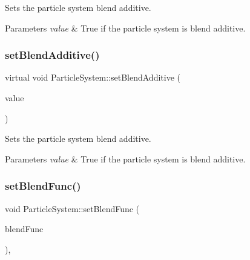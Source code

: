 Sets the particle system blend additive.


\begin{DoxyParams}{Parameters}
{\em value} & True if the particle system is blend additive. \\
\hline
\end{DoxyParams}
\mbox{\label{classParticleSystem_a08affe076082421f74e427128de30509}} 
\subsubsection{\texorpdfstring{set\+Blend\+Additive()}{setBlendAdditive()}\hspace{0.1cm}{\footnotesize\ttfamily [2/2]}}
{\footnotesize\ttfamily virtual void Particle\+System\+::set\+Blend\+Additive (\begin{DoxyParamCaption}\item[{bool}]{value }\end{DoxyParamCaption})\hspace{0.3cm}{\ttfamily [virtual]}}

Sets the particle system blend additive.


\begin{DoxyParams}{Parameters}
{\em value} & True if the particle system is blend additive. \\
\hline
\end{DoxyParams}
\mbox{\label{classParticleSystem_a72e4f69d65e56ad946a672064a75bd9b}} 
\subsubsection{\texorpdfstring{set\+Blend\+Func()}{setBlendFunc()}\hspace{0.1cm}{\footnotesize\ttfamily [1/2]}}
{\footnotesize\ttfamily void Particle\+System\+::set\+Blend\+Func (\begin{DoxyParamCaption}\item[{const \hyperlink{structBlendFunc}{Blend\+Func} \&}]{blend\+Func }\end{DoxyParamCaption})\hspace{0.3cm}{\ttfamily [override]}, {\ttfamily [virtual]}}


